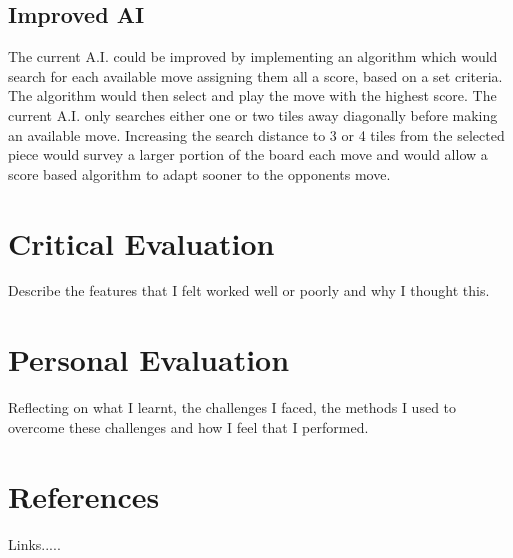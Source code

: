 \documentclass[10pt, a4paper]{article}
\begin{document}
    \subsection{Improved AI}
    The current A.I. could be improved by implementing an 
    \newline
    algorithm which would search for each available move 
    \newline
    assigning them all a score, based on a set criteria. The algorithm would then select and play the move with the highest score.
    \newline 
    The current A.I. only searches either one or two tiles away diagonally before making an available move. Increasing the search distance to 3 or 4 tiles from the selected piece would survey a larger portion of the board each move and would allow a score based algorithm to adapt sooner to the opponents move. 
    
    
    
    
    
    
    
    
    
    
    
    
    
    \section{Critical Evaluation}
    Describe the features that I felt worked well or poorly and why I thought this.
    
    \section{Personal Evaluation}
   Reflecting on what I learnt, the challenges I faced, the methods I used to overcome these challenges and how I feel that I performed.
   
   \section{References}
   Links.....
   
   
\end{document}
